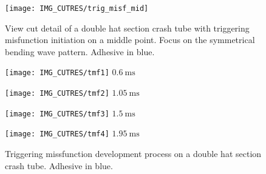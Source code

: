 \documentclass[cmfonts]{witpress}
\begin{document}
\begin{figure}
	\centering
	\texttt{[image: IMG\_CUTRES/trig\_misf\_mid]}
	\caption[View cut detail of a double hat section crash tube with triggering misfunction initiation on a middle point.]{View cut detail of a double hat section crash tube with triggering misfunction initiation on a middle point. Focus on the symmetrical bending wave pattern. Adhesive in blue.}
	\label{fig:trig_misf_mid}
\end{figure}


\begin{figure}
	\centering
	\begin{minipage}[b]{.22\linewidth}
		\centering
		\texttt{[image: IMG\_CUTRES/tmf1]}
		$\SI{0.6}{\ms}$
	\end{minipage}
	\quad
	\begin{minipage}[b]{.22\linewidth}
		\centering
		\texttt{[image: IMG\_CUTRES/tmf2]}
		$\SI{1.05}{\ms}$
	\end{minipage}
	\quad
	\begin{minipage}[b]{.22\linewidth}
		\centering
		\texttt{[image: IMG\_CUTRES/tmf3]}
		$\SI{1.5}{\ms}$
	\end{minipage}
	\quad
	\begin{minipage}[b]{.22\linewidth}
		\centering
		\texttt{[image: IMG\_CUTRES/tmf4]}
		$\SI{1.95}{\ms}$
	\end{minipage}
	\caption[Triggering missfunction development process on a double hat section crash tube.]{Triggering missfunction development process on a double hat section crash tube. Adhesive in blue.}
	\label{fig:tmf}
\end{figure}
\end{document}
